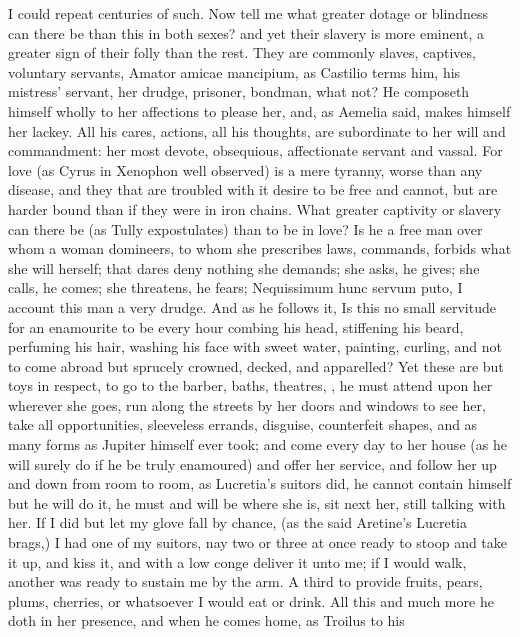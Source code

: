 {I could repeat centuries of such. Now tell me what greater dotage or
blindness can there be than this in both sexes? and yet their slavery
is more eminent, a greater sign of their folly than the rest.
They are commonly slaves, captives, voluntary servants, Amator amicae
mancipium, as Castilio terms him, his mistress' servant, her
drudge, prisoner, bondman, what not? He composeth himself wholly to her
affections to please her, and, as Aemelia said, makes himself her
lackey. All his cares, actions, all his thoughts, are subordinate to
her will and commandment: her most devote, obsequious, affectionate
servant and vassal. For love (as Cyrus in Xenophon well observed)
is a mere tyranny, worse than any disease, and they that are troubled
with it desire to be free and cannot, but are harder bound than if they
were in iron chains. What greater captivity or slavery can there be (as
Tully expostulates) than to be in love? Is he a free man over
whom a woman domineers, to whom she prescribes laws, commands, forbids
what she will herself; that dares deny nothing she demands; she asks,
he gives; she calls, he comes; she threatens, he fears; Nequissimum
hunc servum puto, I account this man a very drudge. And as he follows
it, Is this no small servitude for an enamourite to be every hour
combing his head, stiffening his beard, perfuming his hair, washing his
face with sweet water, painting, curling, and not to come abroad but
sprucely crowned, decked, and apparelled? Yet these are but toys in
respect, to go to the barber, baths, theatres, \etc{}, he must attend upon
her wherever she goes, run along the streets by her doors and windows
to see her, take all opportunities, sleeveless errands, disguise,
counterfeit shapes, and as many forms as Jupiter himself ever took; and
come every day to her house (as he will surely do if he be truly
enamoured) and offer her service, and follow her up and down from room
to room, as Lucretia's suitors did, he cannot contain himself but he
will do it, he must and will be where she is, sit next her, still
talking with her. If I did but let my glove fall by chance, (as
the said Aretine's Lucretia brags,) I had one of my suitors, nay two or
three at once ready to stoop and take it up, and kiss it, and with a
low conge deliver it unto me; if I would walk, another was ready to
sustain me by the arm. A third to provide fruits, pears, plums,
cherries, or whatsoever I would eat or drink. All this and much more he
doth in her presence, and when he comes home, as Troilus to his
}
